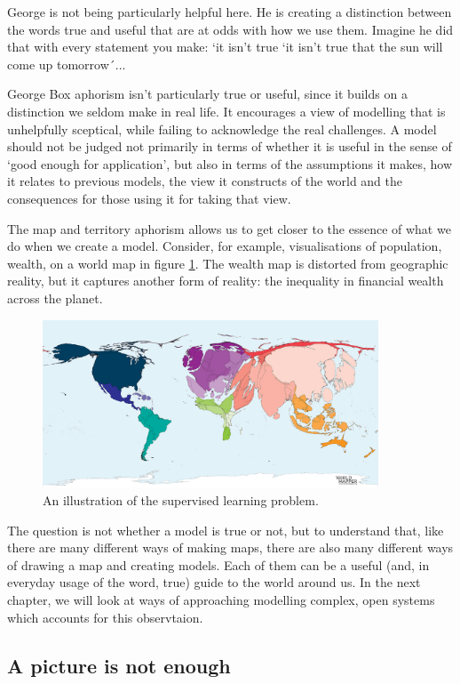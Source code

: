 George is not being particularly helpful here. He is creating a distinction between the words true and useful that are at odds with how we use them. Imagine he did that with every statement you make: `it isn't true   `it isn't true that the sun will come up tomorrow´... 


George Box aphorism isn't particularly true or useful, since it builds on a distinction we seldom make in real life. It encourages a view of modelling that is unhelpfully sceptical, while failing to acknowledge the real challenges. A model should not be judged not primarily in terms of whether it is useful in the sense of `good enough for application', but also in terms of the assumptions it makes, how it relates to previous models, the view it constructs of the world and the consequences for those using it for taking that view.  

The map and territory aphorism allows us to get closer to the essence of what we do when we create a model. Consider, for example, visualisations of population, wealth, on a world map in figure \ref{fig:WealthMap}. The wealth map is distorted from geographic reality, but it captures another form of reality: the inequality in financial wealth across the planet.

\begin{figure}[t]
\centering
\includegraphics[width=10cm]{Figures/Closed/WealthMap}
\centering
\caption{An illustration of the supervised learning problem.   \label{fig:WealthMap}}
\end{figure}

The question is not whether a model is true or not, but to understand that, like there are many different ways of making maps, there are also many different ways of drawing a map and creating models. Each of them can be a useful (and, in everyday usage of the word, true) guide to the world around us. In the next chapter, we will look at ways of approaching modelling complex, open systems which accounts for this observtaion. 


\subsection{A picture is not enough}

